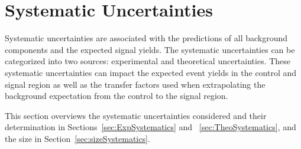 
\chapter{Systematic Uncertainties}
\label{chap:Uncertainties}

Systematic uncertainties are associated with the predictions of all background components and the expected signal yields. The systematic uncertainties can be categorized into two sources: experimental and theoretical uncertainties. These systematic uncertainties can impact the expected event yields in the control and signal region as well as the transfer factors used when extrapolating the background expectation from the control to the signal region.

This section overviews the systematic uncertainties considered and their determination in Sections~\ref{sec:ExpSystematics} and ~\ref{sec:TheoSystematics}, and the size in Section~\ref{sec:sizeSystematics}. %



